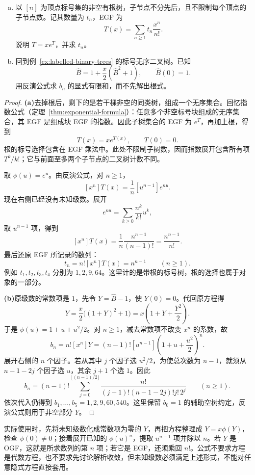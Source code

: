 \documentclass[lang=cn,a4paper,fontset=none,zihao=false,10pt,openany,twoside]{beautybook}
\numberwithin{algorithm}{chapter}
\begin{document}
\begin{example}[由生成函数方程求树的计数通项]\label{ex:lagrange-tree-coefficients}
\begin{enumerate}[(a)]
\item 以 $[n]$ 为顶点标号集的非空有根树，子节点不分先后，且不限制每个顶点的子节点数。记其数量为 $t_n$，EGF 为
\[
 T(x)=\sum_{n\ge1}t_n\frac{x^n}{n!}.
\]
说明 $T=xe^T$，并求 $t_n$。
\item 回到例~\ref{ex:labelled-binary-trees} 的标号无序二叉树。已知
\[
 \widehat B=1+\frac x2(\widehat B^2+1),\qquad \widehat B(0)=1.
\]
用反演公式求 $b_n$ 的显式有限和，而不先解出根式。
\end{enumerate}
\end{example}
\begin{proof}
\par\smallskip\noindent\textbf{(a)}\quad 去掉根后，剩下的是若干棵非空的同类树，组成一个无序集合。回忆指数公式（定理~\ref{thm:exponential-formula}）：任意多个非空标号块组成的无序集合，其 EGF 是组成块 EGF 的指数。因此子树集合的 EGF 为 $e^T$，再加上根，得到
\[
 T(x)=xe^{T(x)},\qquad T(0)=0.
\]
根的标号选择包含在 EGF 乘法中。此处不限制子树数，因而指数展开包含所有项 $T^k/k!$；它与前面至多两个子节点的二叉树计数不同。

取 $\phi(u)=e^u$。由反演公式，对 $n\ge1$，
\[
 [x^n]T(x)=\frac1n[u^{n-1}]e^{nu}.
\]
现在右侧已经没有未知级数。展开
\[
 e^{nu}=\sum_{k\ge0}\frac{n^k}{k!}u^k,
\]
取 $u^{n-1}$ 项，得到
\[
 [x^n]T(x)
 =\frac1n\frac{n^{n-1}}{(n-1)!}
 =\frac{n^{n-1}}{n!}.
\]
最后还原 EGF 所记录的数列：
\[
 t_n=n![x^n]T(x)=n^{n-1}\qquad(n\ge1).
\]
例如 $t_1,t_2,t_3,t_4$ 分别为 $1,2,9,64$。这里计的是带根的标号树，根的选择也属于对象的一部分。

\par\smallskip\noindent\textbf{(b)}\quad 原级数的常数项是 $1$，先令 $Y=\widehat B-1$，使 $Y(0)=0$。代回原方程得
\[
 Y=\frac x2\bigl((1+Y)^2+1\bigr)
 =x\left(1+Y+\frac{Y^2}{2}\right).
\]
于是 $\phi(u)=1+u+u^2/2$。对 $n\ge1$，减去常数项不改变 $x^n$ 的系数，故
\[
 b_n=n![x^n]Y
 =(n-1)![u^{n-1}]\left(1+u+\frac{u^2}{2}\right)^n.
\]
展开右侧的 $n$ 个因子。若从其中 $j$ 个因子选 $u^2/2$，为使总次数为 $n-1$，就须从 $n-1-2j$ 个因子选 $u$，其余 $j+1$ 个选 $1$。因此
\[
 b_n=(n-1)!\sum_{j=0}^{\lfloor(n-1)/2\rfloor}
       \frac{n!}{(j+1)!(n-1-2j)!j!\,2^j}
 \qquad(n\ge1).
\]
依次代入仍得到 $b_1,\ldots,b_5=1,2,9,60,540$。这里保留 $b_0=1$ 的辅助空树约定，反演公式则用于非空部分 $Y$。
\end{proof}

实际使用时，先将未知级数化成常数项为零的 $Y$，再把方程整理成 $Y=x\phi(Y)$，检查 $\phi(0)\ne0$；接着展开已知的 $\phi(u)^n$，提取 $u^{n-1}$ 项并除以 $n$。若 $Y$ 是 OGF，这就是所求数列的第 $n$ 项；若它是 EGF，还须乘回 $n!$。公式不要求方程是代数方程，也不要求先讨论解析收敛，但未知级数必须满足上述形式，不能对任意隐式方程直接套用。
\end{document}
